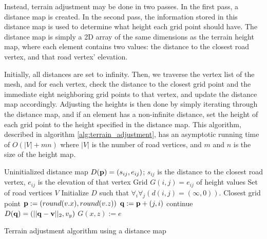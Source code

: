 Instead, terrain adjustment may be done in two passes. In the first pass, a distance map is created. In the second pass, the information stored in this distance map is used to determine what height each grid point should have. The distance map is simply a 2D array of the same dimensions as the terrain height map, where each element contains two values: the distance to the closest road vertex, and that road vertex' elevation. 

Initially, all distances are set to infinity. Then, we traverse the vertex list of the mesh, and for each vertex, check the distance to the closest grid point and the immediate eight neighboring grid points to that vertex, and update the distance map accordingly. Adjusting the heights is then done by simply iterating through the distance map, and if an element has a non-infinite distance, set the height of each grid point to the height specified in the distance map. This algorithm, described in algorithm \ref{alg:terrain_adjustment}, has an asymptotic running time of $O(|V|+mn)$ where $|V|$ is the number of road vertices, and $m$ and $n$ is the size of the height map.

\begin{algorithm}
\begin{algorithmic}
\REQUIRE Uninitialized distance map $D({\mathbf p}) = (s_{ij}, e_{ij})$; $s_{ij}$ is the distance to the closest road vertex, $e_{ij}$ is the elevation of that vertex
\REQUIRE Grid $G(i,j) = e_{ij}$ of height values
\REQUIRE Set of road vertices $V$
\STATE Initialize $D$ such that $\forall_i\forall_j (d(i,j) = (\infty, 0))$. 
    \STATE Closest grid point ${\mathbf p} := (round(v.x), round(v.z))$
            \STATE ${\mathbf q} := {\mathbf p} + (j,i)$
                \STATE continue
            \ENDIF
                \STATE $D({\mathbf q}) = (||{\mathbf q}-{\mathbf v}||_2, v_y)$
            \ENDIF
        \ENDFOR
    \ENDFOR
\ENDFOR
{}
        \STATE $G(x,z) := e$
    \ENDIF
\ENDFOR
\end{algorithmic}
\caption{Terrain adjustment algorithm using a distance map}
\label{alg:terrain_adjustment}
\end{algorithm}


